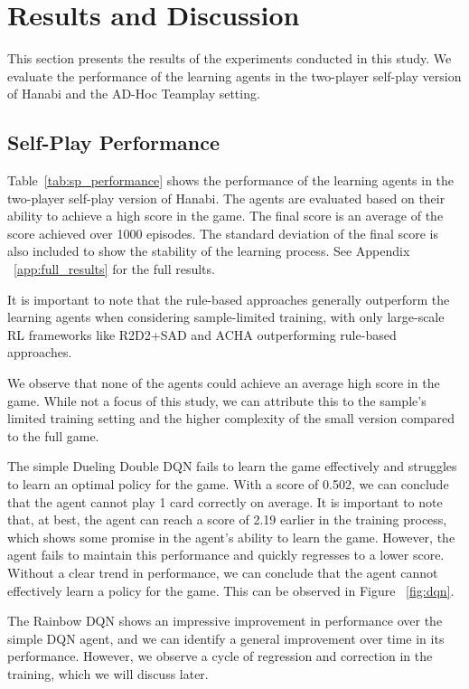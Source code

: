 \section{Results and Discussion}
\label{sec:results}
This section presents the results of the experiments conducted in this study. We evaluate the performance of the learning agents in the two-player self-play version of Hanabi and the AD-Hoc Teamplay setting.   



\subsection*{Self-Play Performance}


Table~\ref{tab:sp_performance} shows the performance of the learning agents in the two-player self-play version of Hanabi. The agents are evaluated based on their ability to achieve a high score in the game. The final score is an average of the score achieved over 1000 episodes. The standard deviation of the final score is also included to show the stability of the learning process. See Appendix ~\ref{app:full_results} for the full results.

It is important to note that the rule-based approaches generally outperform the learning agents when considering sample-limited training, with only large-scale RL frameworks like R2D2+SAD \cite{huSimplifiedActionDecoder2021} and ACHA \cite{bardHanabiChallengeNew2020a} outperforming rule-based approaches.

We observe that none of the agents could achieve an average high score in the game. While not a focus of this study, we can attribute this to the sample's limited training setting and the higher complexity of the small version compared to the full game. 

The simple Dueling Double DQN fails to learn the game effectively and struggles to learn an optimal policy for the game. With a score of 0.502, we can conclude that the agent cannot play 1 card correctly on average. It is important to note that, at best, the agent can reach a score of 2.19 earlier in the training process, which shows some promise in the agent's ability to learn the game. However, the agent fails to maintain this performance and quickly regresses to a lower score. Without a clear trend in performance, we can conclude that the agent cannot effectively learn a policy for the game. This can be observed in Figure ~\ref{fig:dqn}.

The Rainbow DQN shows an impressive improvement in performance over the simple DQN agent, and we can identify a general improvement over time in its performance. However, we observe a cycle of regression and correction in the training, which we will discuss later.

